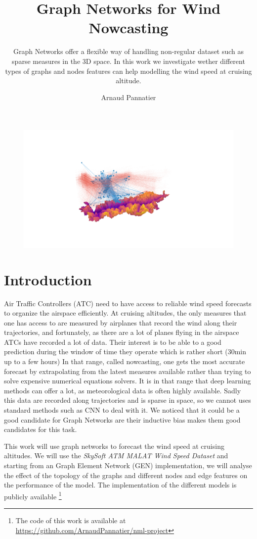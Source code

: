 \documentclass[a4paper,10pt]{article}
\title{Graph Networks for Wind Nowcasting}
\subtitle{ Graph Networks offer a flexible way of handling non-regular dataset such as sparse measures in the 3D space. In this work we investigate wether different types of graphs and nodes features can help modelling the wind speed at cruising altitude.}
\author{Arnaud Pannatier}
\begin{document}
\maketitle

\begin{figure}[htbp]
  \centering
  \includegraphics[trim={350 200 450 150},clip,width=\textwidth]{figs/south-gen.png}
\end{figure}

\newpage
\section{Introduction}
Air Traffic Controllers (ATC) need to have access to reliable wind speed forecasts to organize the airspace efficiently. At cruising altitudes, the only measures that one has access to are measured by airplanes that record the wind along their trajectories, and fortunately, as there are a lot of planes flying in the airspace ATCs have recorded a lot of data. Their interest is to be able to a good prediction during the window of time they operate which is rather short (30min up to a few hours) In that range, called nowcasting, one gets the most accurate forecast by extrapolating from the latest measures available rather than trying to solve expensive numerical equations solvers.
It is in that range that deep learning methods can offer a lot, as meteorological data is often highly available. Sadly this data are recorded along trajectories and is sparse in space, so we cannot uses standard methods such as CNN to deal with it. We noticed that it could be a good candidate for Graph Networks are their inductive bias makes them good candidates for this task.

This work will use graph networks to forecast the wind speed at cruising altitudes. We will use the \textit{SkySoft ATM MALAT Wind Speed Dataset} \cite{skysoft2021dataset} and starting from an Graph Element Network (GEN) \cite{alet2019gen} implementation, we will analyse the effect of the topology of the graphs and different nodes and edge features on the performance of the model. The implementation of the different models is publicly available \footnote{The code of this work is available at \url{https://github.com/ArnaudPannatier/nml-project}}
\end{document}
